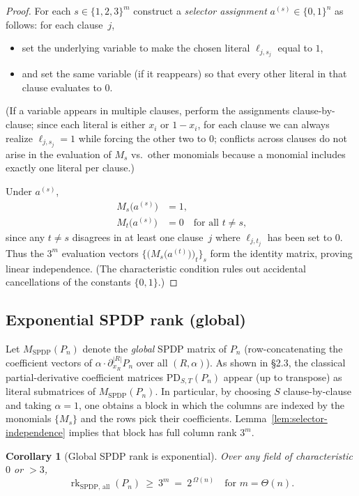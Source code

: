 \documentclass[12pt]{article}
\newtheorem{corollary}[theorem]{Corollary}
\theoremstyle{definition}
\theoremstyle{definition}
\theoremstyle{remark}
\theoremstyle{remark}
\begin{document}
\begin{proof}
For each $s\in\{1,2,3\}^m$ construct a \emph{selector assignment} $a^{(s)}\in\{0,1\}^n$ as follows: for each clause~$j$,
\begin{itemize}
\item set the underlying variable to make the chosen literal $\ell_{j,s_j}$ equal to $1$,
\item and set the same variable (if it reappears) so that every other literal in that clause evaluates to $0$.
\end{itemize}
(If a variable appears in multiple clauses, perform the assignments clause-by-clause; since each literal is either $x_i$ or $1-x_i$, for each clause we can always realize $\ell_{j,s_j}=1$ while forcing the other two to $0$; conflicts across clauses do not arise in the evaluation of $M_s$ vs.\ other monomials because a monomial includes exactly one literal per clause.)

Under $a^{(s)}$,
\begin{align*}
M_s\bigl(a^{(s)}\bigr)&=1,\\
M_t\bigl(a^{(s)}\bigr)&=0\quad\text{for all~$t\neq s$,}
\end{align*}
since any $t\neq s$ disagrees in at least one clause~$j$ where $\ell_{j,t_j}$ has been set to $0$. Thus the $3^m$ evaluation vectors $\bigl\{\bigl(M_s\bigl(a^{(t)}\bigr)\bigr)_t\bigr\}_s$ form the identity matrix, proving linear independence. (The characteristic condition rules out accidental cancellations of the constants $\{0,1\}$.)
\end{proof}

\subsection{Exponential SPDP rank (global)}

Let $M_{\mathrm{SPDP}}(P_n)$ denote the \emph{global} SPDP matrix of $P_n$ (row-concatenating the coefficient vectors of $\alpha\cdot\partial_{x_R}^{|R|}P_n$ over all $(R,\alpha)$). As shown in \S2.3, the classical partial-derivative coefficient matrices $\mathrm{PD}_{S,T}(P_n)$ appear (up to transpose) as literal submatrices of $M_{\mathrm{SPDP}}(P_n)$. In particular, by choosing $S$ clause-by-clause and taking $\alpha=1$, one obtains a block in which the columns are indexed by the monomials $\{M_s\}$ and the rows pick their coefficients. Lemma~\ref{lem:selector-independence} implies that block has full column rank $3^m$.

\begin{corollary}[Global SPDP rank is exponential]\label{cor:global-spdp-exp}
Over any field of characteristic $0$ or $>3$,
\[
\operatorname{rk}_{\mathrm{SPDP},\,\mathrm{all}}(P_n)\ \ge\ 3^m\ =\ 2^{\,\Omega(n)}\quad\text{for~$m=\Theta(n)$.}
\]
\end{corollary}
\end{document}
